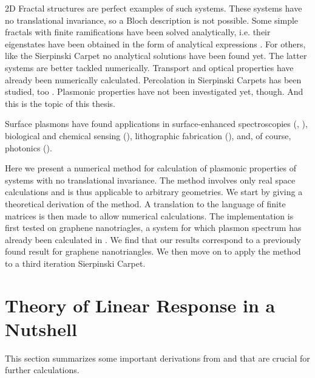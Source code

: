 \documentclass[a4paper,12pt]{article}
\begin{document}
    2D Fractal structures  are perfect examples of such systems. These systems have no translational invariance, so a Bloch description is not possible. Some simple fractals with finite ramifications  have been solved analytically, i.e. their eigenstates have been obtained in the form of analytical expressions \cite{kadanoff1983}. For others, like the Sierpinski Carpet  no analytical solutions have been found yet. The latter systems are better tackled numerically. Transport \cite{transport2016} and optical \cite{optics2017} properties have already been numerically calculated. Percolation in Sierpinski Carpets has been studied, too \cite{percolation1996}. Plasmonic  properties have not been investigated yet, though. And this is the topic of this thesis.

    Surface plasmons  have found applications in surface-enhanced spectroscopies (\cite{raman2005}, \cite{second-harmonic1994}),  biological and chemical sensing (\cite{towards2005}), lithographic fabrication (\cite{nanolithography2004}), and, of course, photonics (\cite{brongersma2007surface}).

    Here we present a numerical method for calculation of plasmonic properties of systems with no translational invariance. The method involves only real space calculations and is thus applicable to arbitrary geometries. We start by giving a theoretical derivation of the method. A translation to the language of finite matrices is then made to allow numerical calculations. The implementation is first tested on graphene nanotriagles, a system for which plasmon spectrum has already been calculated in \cite{plasmonic2015}. We find that our results correspond to a previously found result for graphene nanotriangles. We then move on to apply the method to a third iteration Sierpinski Carpet. 


\newpage
\section{Theory of Linear Response in a Nutshell} \label{sec:linear_response}
    This section summarizes some important derivations from \cite{vonsovskiui1989quantum} and \cite{giuliani2005quantum} that are crucial for further calculations.
\end{document}
